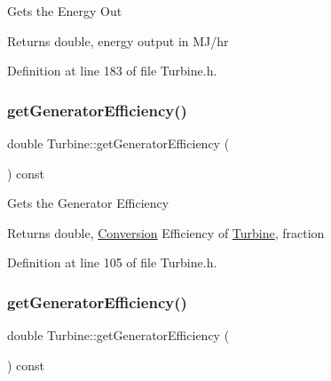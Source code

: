 Gets the Energy Out

\begin{DoxyReturn}{Returns}
double, energy output in M\+J/hr 
\end{DoxyReturn}


Definition at line 183 of file Turbine.\+h.

\mbox{\label{class_turbine_a92266fd994310d1842ba37c05bc40bf8}} 
\subsubsection{\texorpdfstring{get\+Generator\+Efficiency()}{getGeneratorEfficiency()}\hspace{0.1cm}{\footnotesize\ttfamily [1/3]}}
{\footnotesize\ttfamily double Turbine\+::get\+Generator\+Efficiency (\begin{DoxyParamCaption}{ }\end{DoxyParamCaption}) const\hspace{0.3cm}{\ttfamily [inline]}}

Gets the Generator Efficiency

\begin{DoxyReturn}{Returns}
double, \hyperlink{class_conversion}{Conversion} Efficiency of \hyperlink{class_turbine}{Turbine}, fraction 
\end{DoxyReturn}


Definition at line 105 of file Turbine.\+h.

\mbox{\label{class_turbine_a92266fd994310d1842ba37c05bc40bf8}} 
\subsubsection{\texorpdfstring{get\+Generator\+Efficiency()}{getGeneratorEfficiency()}\hspace{0.1cm}{\footnotesize\ttfamily [2/3]}}
{\footnotesize\ttfamily double Turbine\+::get\+Generator\+Efficiency (\begin{DoxyParamCaption}{ }\end{DoxyParamCaption}) const\hspace{0.3cm}{\ttfamily [inline]}}

